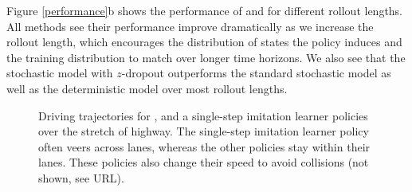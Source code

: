 \documentclass{article} %
\begin{document}
Figure \ref{performance}b shows the performance of \modelnamedrop and \modelnameil for different rollout lengths.
All methods see their performance improve dramatically as we increase the rollout length, which encourages the distribution of states the policy induces and the training distribution to match over longer time horizons. We also see that the stochastic model with $z$-dropout outperforms the standard stochastic model as well as the deterministic model over most rollout lengths. 







\begin{figure}[t!]
    \centering
    \caption{Driving trajectories for \modelnamedrop, \modelnameil and a single-step imitation learner policies over the stretch of highway. The single-step imitation learner policy often veers across lanes, whereas the other policies stay within their lanes. These policies also change their speed to avoid collisions (not shown, see URL).}
    \label{trajectories}
\end{figure}
\end{document}
